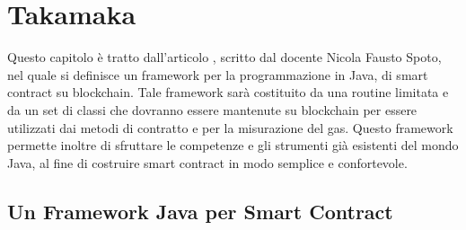
\chapter{Takamaka} \label{takamaka-chapter}
Questo capitolo è tratto dall'articolo \cite{paper-takamaka:spoto}, scritto dal docente Nicola Fausto Spoto, nel quale si definisce un framework per la programmazione in Java, di smart contract su blockchain. Tale framework sarà costituito da una routine limitata e da un set di classi che dovranno essere mantenute su blockchain per essere utilizzati dai metodi di contratto e per la misurazione del gas. Questo framework permette inoltre di sfruttare le competenze e gli strumenti già esistenti del mondo Java, al fine di costruire smart contract in modo semplice e confortevole. 

\section{Un Framework Java per Smart Contract} \label{takamaka:un-framework-java-per-smart-contract}

